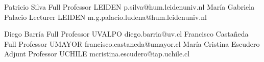 





\begin{referees}
		{Patricio Silva}
		{Full Professor}
		{LEIDEN}
		{p.silva@hum.leidenuniv.nl}
		{María Gabriela Palacio}
		{Lecturer}
		{LEIDEN}
		{m.g.palacio.ludena@hum.leidenuniv.nl}
\end{referees}

\begin{referees}
		{Diego Barría}
		{Full Professor}
		{UVALPO}
		{diego.barria@uv.cl}
		{Francisco Castañeda}
		{Full Professor}
		{UMAYOR}
		{francisco.castaneda@umayor.cl}
		{María Cristina Escudero}
		{Adjunt Professor}
		{UCHILE}
		{mcristina.escudero@iap.uchile.cl}
\end{referees}
